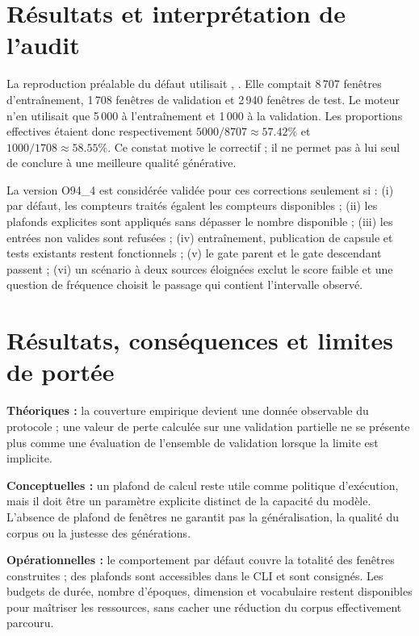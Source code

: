 \documentclass[11pt,a4paper]{article}
\begin{document}
\section{Résultats et interprétation de l'audit}
La reproduction préalable du défaut utilisait \texttt{}, \texttt{}. Elle comptait 8\,707 fenêtres d'entraînement, 1\,708 fenêtres de validation et 2\,940 fenêtres de test. Le moteur n'en utilisait que 5\,000 à l'entraînement et 1\,000 à la validation. Les proportions effectives étaient donc respectivement $5000/8707\approx57.42\%$ et $1000/1708\approx58.55\%$. Ce constat motive le correctif ; il ne permet pas à lui seul de conclure à une meilleure qualité générative.

La version O94\_4 est considérée validée pour ces corrections seulement si : (i) par défaut, les compteurs traités égalent les compteurs disponibles ; (ii) les plafonds explicites sont appliqués sans dépasser le nombre disponible ; (iii) les entrées non valides sont refusées ; (iv) entraînement, publication de capsule et tests existants restent fonctionnels ; (v) le gate parent et le gate descendant passent ; (vi) un scénario à deux sources éloignées exclut le score faible et une question de fréquence choisit le passage qui contient l'intervalle observé.

\section{Résultats, conséquences et limites de portée}
\textbf{Théoriques :} la couverture empirique devient une donnée observable du protocole ; une valeur de perte calculée sur une validation partielle ne se présente plus comme une évaluation de l'ensemble de validation lorsque la limite est implicite.

\textbf{Conceptuelles :} un plafond de calcul reste utile comme politique d'exécution, mais il doit être un paramètre explicite distinct de la capacité du modèle. L'absence de plafond de fenêtres ne garantit pas la généralisation, la qualité du corpus ou la justesse des générations.

\textbf{Opérationnelles :} le comportement par défaut couvre la totalité des fenêtres construites ; des plafonds sont accessibles dans le CLI et sont consignés. Les budgets de durée, nombre d'époques, dimension et vocabulaire restent disponibles pour maîtriser les ressources, sans cacher une réduction du corpus effectivement parcouru.
\end{document}

